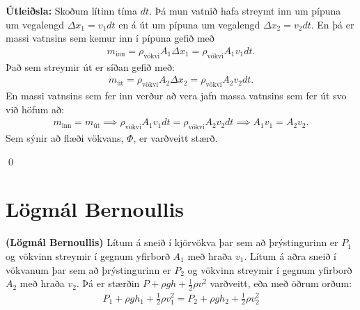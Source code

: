 \textbf{Útleiðsla:} Skoðum lítinn tíma $dt$. Þá mun vatnið hafa streymt inn um pípuna um vegalengd $\Delta x_1 = v_1 dt$ en á út um pípuna um vegalengd $\Delta x_2 = v_2 dt$. En þá er massi vatnsins sem kemur inn í pípuna gefið með
\begin{align*}
    m_{\text{inn}} = \rho_{\text{vökvi}} A_1 \Delta x_1 = \rho_{\text{vökvi}} A_1 v_1 dt.
\end{align*}
Það sem streymir út er síðan gefið með:
\begin{align*}
    m_{\text{út}} = \rho_{\text{vökvi}} A_2 \Delta x_2 = \rho_{\text{vökvi}} A_2 v_2 dt.
\end{align*}
En massi vatnsins sem fer inn verður að vera jafn massa vatnsins sem fer út svo við höfum að:
\begin{align*}
    m_{\text{inn}} = m_{\text{út}} \implies \rho_{\text{vökvi}} A_1 v_1 dt =  \rho_{\text{vökvi}} A_2 v_2 dt \implies A_1 v_1 = A_2 v_2.
\end{align*}
Sem sýnir að flæði vökvans, $\Phi$, er varðveitt stærð.

\qed



\section{Lögmál Bernoullis}

\begin{tcolorbox}
\begin{theorem}
\textbf{(Lögmál Bernoullis)} Lítum á sneið í kjörvökva þar sem að þrýstingurinn er $P_1$ og vökvinn streymir í gegnum yfirborð $A_1$ með hraða $v_1$. Lítum á aðra sneið í vökvanum þar sem að þrýstingurinn er $P_2$ og vökvinn streymir í gegnum yfirborð $A_2$ með hraða $v_2$. Þá er stærðin $ P + \rho g h + \frac{1}{2}\rho v^2$ varðveitt, eða með öðrum orðum:
\begin{align*}
    P_1 + \rho g h_1 + \frac{1}{2}\rho v_1^2 =  P_2 + \rho g h_2 + \frac{1}{2}\rho v_2^2
\end{align*}
\end{theorem}
\end{tcolorbox}

